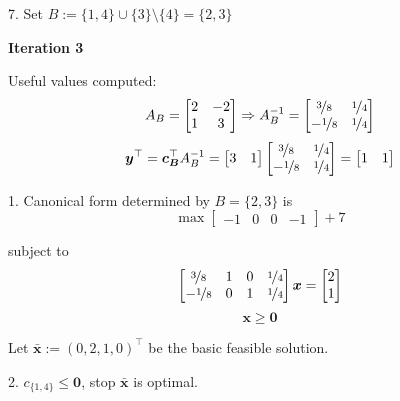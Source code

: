 \begin{exbox}
\begin{example}
        7. Set $ B:=\{1,4\}\cup \{3\}\setminus\{4\}=\{2,3\} $

        \textbf{Iteration 3}

        Useful values computed:
        \[ A_B=
            \begin{bmatrix}
                2 & -2 \\
                1 & 3  \\
            \end{bmatrix} \Rightarrow
            A_B^{-1}=
            \begin{bmatrix}
                \nicefrac{3}{8}  & \nicefrac{1}{4} \\
                -\nicefrac{1}{8} & \nicefrac{1}{4}
            \end{bmatrix} \]
        \[ \bm{y}^\top=\bm{c_B}^\top A_B^{-1}=
            \begin{bmatrix}
                3 & 1
            \end{bmatrix}
            \begin{bmatrix}
                \nicefrac{3}{8}  & \nicefrac{1}{4} \\
                -\nicefrac{1}{8} & \nicefrac{1}{4}
            \end{bmatrix}=
            \begin{bmatrix}
                1 & 1
            \end{bmatrix}\]

        1. Canonical form determined by $ B=\{2,3\} $ is
        \[ \max
            \begin{bmatrix}
                -1 & 0 & 0 & -1
            \end{bmatrix} + 7\]

        subject to
        \[
            \begin{bmatrix}
                \nicefrac{3}{8}  & 1 & 0 & \nicefrac{1}{4} \\
                -\nicefrac{1}{8} & 0 & 1 & \nicefrac{1}{4}
            \end{bmatrix}\bm{x}=
            \begin{bmatrix}
                2 \\
                1
            \end{bmatrix}\]
        \[ \bm{x}\geqslant  \bm{0} \]

        Let $ \bm{\bar{x}}:=(0,2,1,0)^\top $ be the basic feasible solution.

        2. $ c_{\{1,4\}}\leqslant \bm{0} $, stop $ \bm{\bar{x}} $ is optimal.


\end{example}
\end{exbox}
